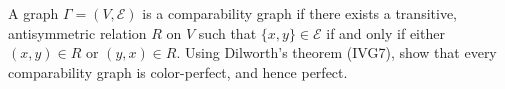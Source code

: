 A graph $\Gamma = (V, \mathcal{E})$ is a comparability graph if there exists a transitive, antisymmetric relation $R$ on $V$ such that $\{x, y\} \in \mathcal{E}$ if and only if either $(x, y) \in R$ or $(y, x) \in R$. Using Dilworth's theorem (IVG7), show that every comparability graph is color-perfect, and hence perfect.

